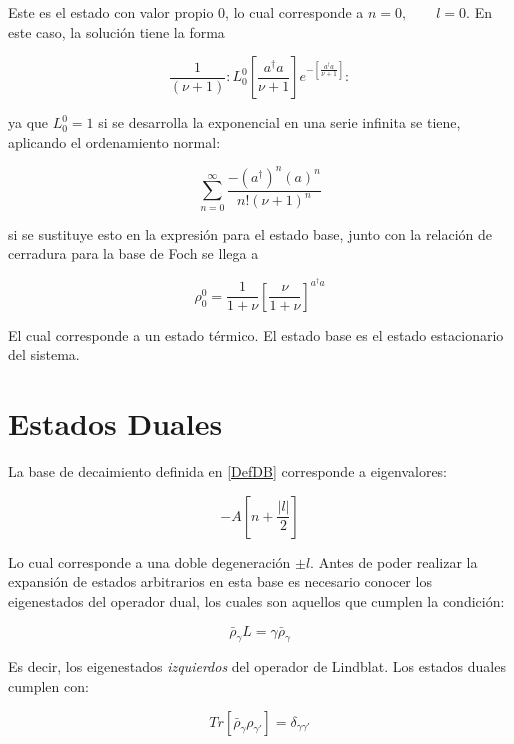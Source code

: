 \documentclass[a4paper,10pt]{report}
\begin{document}
Este es el estado con valor propio 0, lo cual corresponde a $n=0, \qquad l=0$. En este caso, la solución tiene la forma

\begin{equation}
\frac{1}{(\nu+1)}:L_0^0[\frac{a^\dagger a}{\nu+1}]e^{-[\frac{a^\dagger a}{\nu+1}]}:
\end{equation}

ya que $L_0^0 = 1$ \cite{ArfkenMM} si se desarrolla la exponencial en una serie infinita se tiene, aplicando el ordenamiento normal:

\begin{equation}
\sum_{n=0}^\infty \frac{-(a^\dagger)^n (a)^n}{n!(\nu+1)^n}
\end{equation}

si se sustituye esto en la expresión para el estado base, junto con la relación de cerradura para la base de Foch se llega a \cite{EnglertDB}

\begin{equation}
\rho_0^0 = \frac{1}{1+\nu} [\frac{\nu}{1+\nu}]^{a^\dagger a}
\end{equation}

El cual corresponde a un estado térmico. El estado base es el estado estacionario del sistema.

\section{Estados Duales}

La base de decaimiento \cite{EnglertDB} definida en \ref{DefDB} corresponde a eigenvalores:

\begin{equation}
 -A[n+\frac{|l|}{2}]
\end{equation}

Lo cual corresponde a una doble degeneración $\pm l$. Antes de poder realizar la expansión de estados arbitrarios en esta base es necesario conocer los eigenestados del operador dual, los cuales son aquellos que cumplen la condición\cite{EnglertDB}:

\begin{equation}
\bar{\rho}_\gamma L = \gamma\bar{\rho}_\gamma
\end{equation}

Es decir, los eigenestados \textit{izquierdos} del operador de Lindblat. Los estados duales cumplen con:

\begin{equation}
Tr[\bar{\rho}_{\gamma}\rho_{\gamma'}] = \delta_{\gamma\gamma'}
\end{equation}
\end{document}

